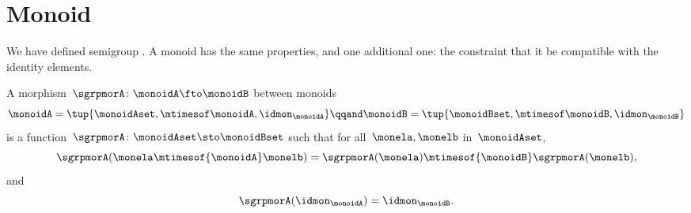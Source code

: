 \section{Monoid \whomos}
We have defined semigroup \whomo.
A monoid \whomo has the same properties, and one additional one: the constraint that it be compatible with the identity elements.

\begin{ctdefinition}
    \label{def:monoid-mor}
    A morphism~$\sgrpmorA\colon \monoidA \fto \monoidB$ between monoids
    \begin{equation*}
        \monoidA = \tup{\monoidAset, \mtimesof\monoidA, \idmon_\monoidA}
        \qqand
        \monoidB = \tup{\monoidBset, \mtimesof\monoidB, \idmon_\monoidB}
    \end{equation*}
    is a function~$\sgrpmorA \colon \monoidAset \sto \monoidBset$ such that for all~$\monela, \monelb$ in~$\monoidAset$,
    \begin{equation}
        \label{eq:mon-mor-comp}
        \sgrpmorA (\monela \mtimesof{\monoidA} \monelb) = \sgrpmorA (\monela) \mtimesof{\monoidB}  \sgrpmorA(\monelb),
    \end{equation}
    and
    \begin{equation}
        \label{eq:mon-id-comp}
        \sgrpmorA (\idmon_\monoidA) = \idmon_{\monoidB}.
    \end{equation}
\end{ctdefinition}
